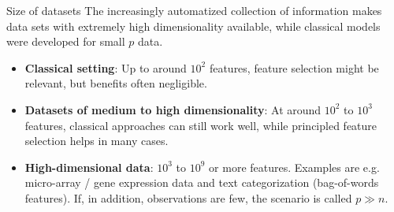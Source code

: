\documentclass[11pt,compress,t,notes=noshow, xcolor=table]{beamer}
\begin{document}
  \begin{vbframe}{Size of datasets}
The increasingly automatized collection of information makes data sets with extremely high dimensionality available, while classical models were developed for small $p$ data.
\vspace{0.5cm}
    \begin{itemize}
    \setlength{\itemsep}{1.2em}
      \item \textbf{Classical setting}: Up to around $10^2$ features, feature selection might be relevant, but benefits often negligible.
      \item \textbf{Datasets of medium to high dimensionality}:
        At around $10^2$ to $10^3$ features, classical approaches can still work well, while principled feature selection helps in many cases.
      \item \textbf{High-dimensional data}: $10^3$ to $10^9$ or more features.
        Examples are e.g. micro-array / gene expression data and text categorization (bag-of-words features).
        If, in addition, observations are few, the scenario is called $p \gg n$.
    \end{itemize}

  \end{vbframe}
\end{document}

